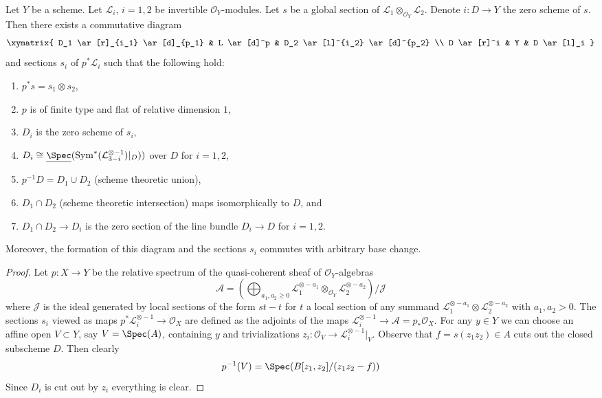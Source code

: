 \begin{lemma}
\label{lemma-decompose-section}
Let $Y$ be a scheme. Let $\mathcal{L}_i$, $i = 1, 2$ be invertible
$\mathcal{O}_Y$-modules. Let $s$ be a global section of
$\mathcal{L}_1 \otimes_{\mathcal{O}_Y} \mathcal{L}_2$.
Denote $i : D \to Y$ the zero scheme of $s$.
Then there exists a commutative diagram
$$
\xymatrix{
D_1 \ar[r]_{i_1} \ar[d]_{p_1} &
L \ar[d]^p &
D_2 \ar[l]^{i_2} \ar[d]^{p_2} \\
D \ar[r]^i &
Y &
D \ar[l]_i
}
$$
and sections $s_i$ of $p^*\mathcal{L}_i$ such that
the following hold:
\begin{enumerate}
\item $p^*s = s_1 \otimes s_2$,
\item $p$ is of finite type and flat of relative dimension $1$,
\item $D_i$ is the zero scheme of $s_i$,
\item $D_i \cong
\underline{\Spec}(\text{Sym}^*(\mathcal{L}_{3 - i}^{\otimes -1})|_D))$
over $D$ for $i = 1, 2$,
\item $p^{-1}D = D_1 \cup D_2$ (scheme theoretic union),
\item $D_1 \cap D_2$ (scheme theoretic intersection) maps
isomorphically to $D$, and
\item $D_1 \cap D_2 \to D_i$
is the zero section of the line bundle $D_i \to D$ for $i = 1, 2$.
\end{enumerate}
Moreover, the formation of this diagram and the sections $s_i$
commutes with arbitrary base change.
\end{lemma}

\begin{proof}
Let $p : X \to Y$ be the relative spectrum of the quasi-coherent
sheaf of $\mathcal{O}_Y$-algebras
$$
\mathcal{A} =
\left(\bigoplus\nolimits_{a_1, a_2 \geq 0}
\mathcal{L}_1^{\otimes -a_1} \otimes_{\mathcal{O}_Y}
\mathcal{L}_2^{\otimes -a_2}\right)/\mathcal{J}
$$
where $\mathcal{J}$ is the ideal generated by local sections of
the form $st - t$ for $t$ a local section of any summand
$\mathcal{L}_1^{\otimes -a_1} \otimes \mathcal{L}_2^{\otimes -a_2}$
with $a_1, a_2 > 0$. The sections $s_i$ viewed as maps
$p^*\mathcal{L}_i^{\otimes -1} \to \mathcal{O}_X$ are defined as the adjoints
of the maps $\mathcal{L}_i^{\otimes -1} \to \mathcal{A} = p_*\mathcal{O}_X$.
For any $y \in Y$ we can choose an affine
open $V \subset Y$, say $V = \Spec(A)$, containing $y$ and
trivializations $z_i : \mathcal{O}_V \to \mathcal{L}_i^{\otimes -1}|_V$.
Observe that $f = s(z_1z_2) \in A$ cuts out the closed subscheme $D$.
Then clearly
$$
p^{-1}(V) = \Spec(B[z_1, z_2]/(z_1 z_2 - f))
$$
Since $D_i$ is cut out by $z_i$ everything is clear.
\end{proof}

